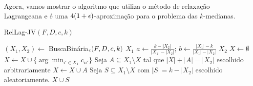 Agora, vamos mostrar o algoritmo que utiliza o método de relaxação Lagrangeana e é uma $4(1 + \epsilon)$-aproximação para o problema das $k$-medianas.

\begin{algorithm}
    \caption{\sc RelLag-JV$(F,D,c,k)$}
    \begin{algorithmic}[1]
        \State $(X_1,X_2) \gets$ {\sc BuscaBinária}$_\epsilon(F,D,c,k)$
        \State \Return $X_1$
        \EndIf
        \State $a \gets \frac{k-|X_2|}{|X_1| - |X_2|}$; $b \gets \frac{|X_1| - k}{|X_1| - |X_2|}$
        \State \Return $X_2$
        \EndIf
        \State $X \gets \emptyset$
        \State $X \gets X \cup \{\arg\min_{i' \in X_1} c_{ii'}\}$
        \EndFor
        \State Seja $ A \subseteq X_1\setminus X$ tal que $|X| + |A| = |X_2|$ escolhido arbitrariamente
        \State $X \gets X \cup A$
        \EndIf
        \State Seja $S \subseteq X_1 \setminus X$ com $|S| = k - |X_2|$ escolhido aleatoriamente.
        \State \Return $X \cup S$
    \end{algorithmic}
\end{algorithm}

